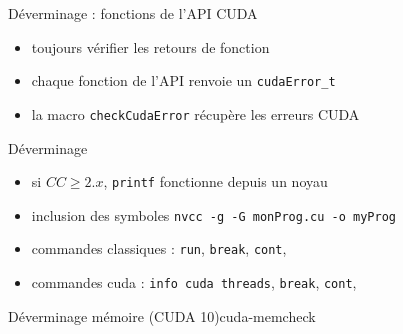 \documentclass[11pt,mathserif]{beamer}
\newcommand{\scout}{\faAngellist}
\newcommand{\argi}{\faLightbulbO}
\newcommand{\kontuz}{\faExclamationTriangle}
\begin{document}
\begin{frame}{Déverminage : fonctions de l'API CUDA}
  \begin{itemize}[<+->]
    \item[\kontuz] toujours vérifier les retours de fonction 
\begin{center}
  
\end{center}
    \item[\argi] chaque fonction de l'API renvoie un \texttt{cudaError\_t}
    \item[\scout] la macro \texttt{checkCudaError} récupère les erreurs CUDA
\begin{center}
  
\end{center}
  \end{itemize}
\end{frame}

\begin{frame}{Déverminage}
  \begin{itemize}[<+->]
        \item[\scout] si $CC \geqslant 2.x$, \texttt{printf} fonctionne depuis un noyau 
        \item[\argi] inclusion des symboles \texttt{nvcc -g -G monProg.cu -o myProg}
   \end{itemize}
\pause
  
  \begin{itemize}[<+->]
    \item[\argi] commandes classiques : \texttt{run}, \texttt{break}, \texttt{cont}, 
    \item[\argi] commandes cuda : \texttt{info cuda threads}, \texttt{break}, \texttt{cont}, 
   \end{itemize}
\end{frame}

\begin{frame}{Déverminage mémoire (CUDA 10)}{cuda-memcheck}
  
\end{frame}
\end{document}
